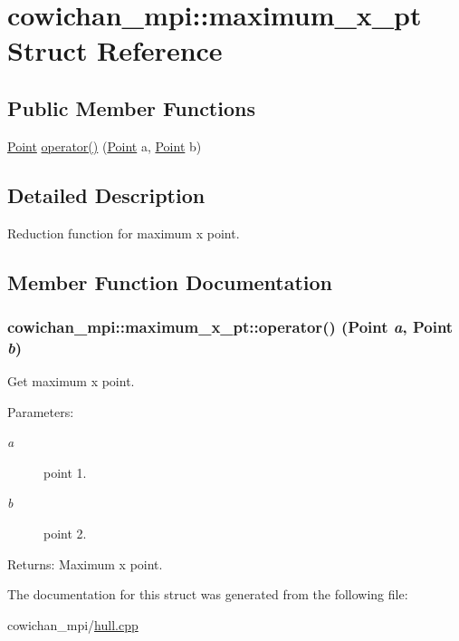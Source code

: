 \hypertarget{structcowichan__mpi_1_1maximum__x__pt}{
\section{cowichan\_\-mpi::maximum\_\-x\_\-pt Struct Reference}
\label{structcowichan__mpi_1_1maximum__x__pt}
}
\subsection*{Public Member Functions}
\begin{CompactItemize}
\item 
\hyperlink{class_point}{Point} \hyperlink{structcowichan__mpi_1_1maximum__x__pt_a056f09712e6345f5425c11d52aaf466}{operator()} (\hyperlink{class_point}{Point} a, \hyperlink{class_point}{Point} b)
\end{CompactItemize}


\subsection{Detailed Description}
Reduction function for maximum x point. 

\subsection{Member Function Documentation}
\hypertarget{structcowichan__mpi_1_1maximum__x__pt_a056f09712e6345f5425c11d52aaf466}{
\subsubsection[{operator()}]{ cowichan\_\-mpi::maximum\_\-x\_\-pt::operator() ({\bf Point} {\em a}, \/  {\bf Point} {\em b})}}
\label{structcowichan__mpi_1_1maximum__x__pt_a056f09712e6345f5425c11d52aaf466}


Get maximum x point. \begin{Desc}
\item[Parameters:]
\begin{description}
\item[{\em a}]point 1. \item[{\em b}]point 2. \end{description}
\end{Desc}
\begin{Desc}
\item[Returns:]Maximum x point. \end{Desc}


The documentation for this struct was generated from the following file:\begin{CompactItemize}
\item 
cowichan\_\-mpi/\hyperlink{cowichan__mpi_2hull_8cpp}{hull.cpp}\end{CompactItemize}
